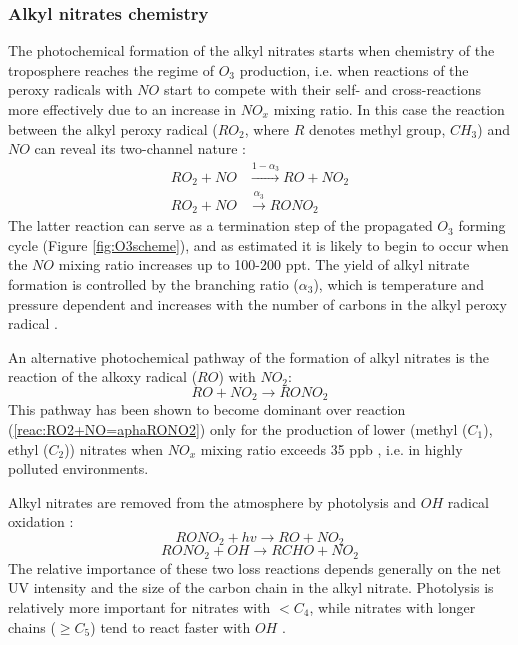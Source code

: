 \documentclass[11pt,a4paper]{article}
\begin{document}
\subsubsection*{Alkyl nitrates chemistry}\label{into_ANchem}
The photochemical formation of the alkyl nitrates starts when chemistry of the troposphere reaches the regime of $O_3$ production, i.e. when reactions of the peroxy radicals with $NO$ start to compete with their self- and cross-reactions more effectively due to an increase in $NO_x$ mixing ratio. In this case the reaction between the alkyl peroxy radical ($RO_2$, where $R$ denotes methyl group, $CH_3$) and $NO$ can reveal its two-channel nature \citep{Day2003}:
\begin{subequations} \label{reac:RONO2alpha}
\begin{align}
RO_2 + NO &\xrightarrow{1-\alpha_3} RO + NO_2 \label{reac:RO2+NO=aphaRO+NO2}\\
RO_2 + NO &\xrightarrow{\alpha_3} RONO_2 \label{reac:RO2+NO=aphaRONO2}
\end{align}
\end{subequations}
The latter reaction can serve as a termination step of the propagated $O_3$ forming cycle (Figure \ref{fig:O3scheme}), and as \cite{Roberts1998} estimated it is likely to begin to occur when the $NO$ mixing ratio increases up to 100-200 ppt. The yield of alkyl nitrate formation is controlled by the branching ratio ($\alpha_3$), which is temperature and pressure dependent and increases with the number of carbons in the alkyl peroxy radical \citep{Roberts1990}.

An alternative photochemical pathway of the formation of alkyl nitrates is the reaction of the alkoxy radical ($RO$) with $NO_2$:
\begin{equation}\label{reac:RO+NO2=RONO2}
RO + NO_2 \rightarrow RONO_2
\end{equation}
This pathway has been shown to become dominant over reaction (\ref{reac:RO2+NO=aphaRONO2}) only for the production of lower (methyl ($C_1$), ethyl ($C_2$)) nitrates when $NO_x$ mixing ratio exceeds 35 ppb \citep{Archibald2007}, i.e. in highly polluted environments.

Alkyl nitrates are removed from the atmosphere by photolysis \citep{Turberg1990} and $OH$ radical oxidation \citep{Talukdar1997}:
\begin{equation} \label{reac:RONO2+hv=RO+NO2}
RONO_2 + hv \rightarrow RO + NO_2
\end{equation}
\begin{equation} \label{reac:RONO2+OH=RCHO+NO2}
RONO_2 + OH \rightarrow RCHO + NO_2
\end{equation}
The relative importance of these two loss reactions depends generally on the net UV intensity and the size of the carbon chain in the alkyl nitrate. Photolysis is relatively more important for nitrates with $< C_4$, while nitrates with longer chains ($\geq C_5$) tend to react faster with $OH$ \citep{Worton2010}.
\end{document}
